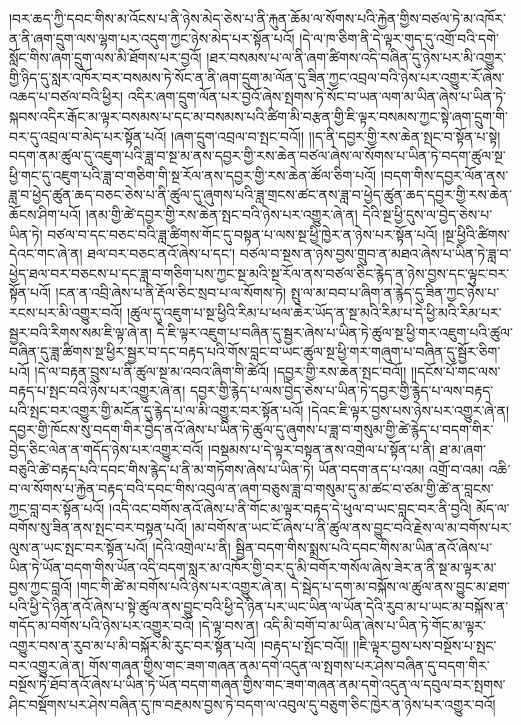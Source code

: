 །བར་ཆད་ཀྱི་དབང་གིས་མ་འོངས་པ་ནི་ཉེས་མེད་ཅེས་པ་ནི་རྐུན་ཆོམ་ལ་སོགས་པའི་རྐྱེན་གྱིས་བཙལ་ཏེ་མ་འཁོར་ན་ནི་ཞག་དྲུག་ལས་ལྷག་པར་འདུག་ཀྱང་ཉེས་མེད་པར་སྟོན་པའོ། །དེ་ལ་ཁ་ཅིག་ནི་དེ་ལྟར་གུད་དུ་འགྲོ་བའི་དགེ་སློང་གིས་ཞག་དྲུག་ལས་མི་ཐོགས་པར་བྱའོ། །ཐར་བསམས་པ་ལ་ནི་ཞག་ཚིགས་འདི་བཞིན་དུ་ཉེས་པར་མི་འགྱུར་གྱི་ཉིད་དུ་སླར་འཁོར་བར་བསམས་ཏེ་སོང་ན་ནི་ཞག་དྲུག་མ་ལོན་དུ་ཟིན་ཀྱང་འབྲལ་བའི་ཉེས་པར་འགྱུར་རོ་ཞེས་འཆད་པ་བཙལ་བའི་ཕྱིར། འདིར་ཞག་དྲུག་ལོན་པར་བྱའོ་ཞེས་སྤགས་ཏེ་སོང་བ་ཡན་ལག་མ་ཡིན་ཞེས་པ་ཡིན་ཏེ་སྐབས་འདིར་རྒོང་མ་ལྟར་བསམས་པ་དང་མ་བསམས་པའི་ཚིག་མི་བརྩན་གྱི་ཇི་ལྟར་བསམས་ཀྱང་སྟེ་ཞག་དྲུག་གི་བར་དུ་འབྲལ་བ་མེད་པར་སྟོན་པའོ། །ཞག་དྲུག་འབྲལ་བ་སྤང་བའོ།། །།ད་ནི་དབྱར་གྱི་རས་ཆེན་སྤང་བ་སྟོན་པ་སྟེ། བདག་ནམ་ཚུལ་དུ་འཇུག་པའི་ཟླ་བ་སྔ་མ་ནས་དབྱར་གྱི་རས་ཆེན་བཙལ་ཞེས་ལ་སོགས་པ་ཡིན་ཏེ་བདག་ཚུལ་སྔ་ཕྱི་གང་དུ་འཇུག་པའི་ཟླ་བ་གཅིག་གི་སྔ་རོལ་ནས་དབྱར་གྱི་རས་ཆེན་ཚོལ་ཅིག་པའོ། །བདག་གིས་དབྱར་ལོན་ནས་ཟླ་བ་ཕྱེད་ཚུན་ཆད་བཅང་ཅེས་པ་ནི་ཚུལ་དུ་ཞུགས་པའི་ཟླ་གྲངས་ཚང་ནས་ཟླ་བ་ཕྱེད་ཚུན་ཆད་དབྱར་གྱི་རས་ཆེན་ཆོངས་ཤིག་པའོ། །ནམ་གྱི་ཚེ་དབྱར་གྱི་རས་ཆེན་སྤང་བའི་ཉེས་པར་འགྱུར་ཞེ་ན། དེའི་སྔ་ཕྱི་དུས་ལ་བྱེད་ཅེས་པ་ཡིན་ཏེ། བཙལ་བ་དང་བཅང་བའི་ཟླ་ཚིགས་གོང་དུ་བསྟན་པ་ལས་སྔ་ཕྱི་ཁྱེར་ན་ཉེས་པར་སྟོན་པའོ། །སྔ་ཕྱིའི་ཚིགས་དེའང་གང་ཞེ་ན། ཐལ་བར་བཅང་ནའོ་ཞེས་པ་དང་། བཙལ་བ་སྔས་ན་ཉེས་བྱས་གྲུབ་ན་མཐའ་ཞེས་པ་ཡིན་ཏེ་ཟླ་བ་ཕྱེད་ཐལ་བར་བཅངས་པ་དང་ཟླ་བ་གཅིག་པས་ཀྱང་སྔ་མའི་སྔ་རོལ་ནས་བཙལ་ཅིང་རྙེད་ན་ཉེས་བྱས་དང་ལྟུང་བར་སྟོན་པའོ། །ངན་ན་འབྲི་ཞེས་པ་ནི་རྡོལ་ཅིང་སྲབ་པ་ལ་སོགས་ཏེ། སྤུ་ལ་མ་བབ་པ་ཞིག་ན་རྙེད་དུ་ཟིན་ཀྱང་ཉེས་པ་རངས་པར་མི་འགྱུར་བའོ། །ཚུལ་དུ་འཇུག་པ་སྔ་ཕྱིའི་རིམ་པ་ཕལ་ཆེར་ཡོད་ན་སྔ་མའི་རིམ་པ་དེ་ཕྱི་མའི་རིམ་པར་སྦྱར་བའི་རིགས་སམ་ཇི་ལྟ་ཞེ་ན། དེ་ཇི་ལྟར་འཇུག་པ་བཞིན་དུ་སྦྱར་ཞེས་པ་ཡིན་ཏེ་ཚུལ་སྔ་ཕྱི་གར་འཇུག་པའི་ཚུལ་བཞིན་དུ་ཟླ་ཚིགས་སྔ་ཕྱིར་སྦྱར་བ་དང་བརྟད་པའི་གོས་བླང་བ་ཡང་ཚུལ་སྔ་ཕྱི་གར་གཞུག་པ་བཞིན་དུ་སྦྱོར་ཅིག་པའོ། །དེ་ལ་བརྟན་བྲུས་པ་ནི་ཚུལ་སྔ་མ་འབའ་ཞིག་གི་ཚེའོ། །དབྱར་གྱི་རས་ཆེན་སྤང་བའོ།། །།དངོས་པོ་གང་ལས་བརྟད་པ་སྤང་བའི་ཉེས་པར་འགྱུར་ཞེ་ན། དབྱར་གྱི་རྙེད་པ་ལས་བྱེད་ཅེས་པ་ཡིན་ཏེ་དབྱར་གྱི་རྙེད་པ་ལས་བརྟད་པའི་སྤང་བར་འགྱུར་གྱི་མངོན་དུ་རྙེད་པ་ལ་མི་འགྱུར་བར་སྟོན་པའོ། །དེའང་ཇི་ལྟར་བྱས་པས་ཉེས་པར་འགྱུར་ཞེ་ན། དབྱར་གྱི་ཁོངས་སུ་བདག་གིར་བྱེད་ནའོ་ཞེས་པ་ཡིན་ཏེ་ཚུལ་དུ་ཞུགས་པ་ཟླ་བ་གསུམ་གྱི་ཚེ་རྙེད་པ་བདག་གིར་བྱེད་ཅིང་ལེན་ན་གདོད་ཉེས་པར་འགྱུར་བའོ། །བསྡམས་པ་དེ་ལྟར་བསྟན་ནས་འགྲེལ་པ་སྟོན་པ་ནི། ཐ་མ་ཞག་བཅུའི་ཚེ་བརྟད་པའི་དབང་གིས་རྙེད་པ་ནི་མ་གཏོགས་ཞེས་པ་ཡིན་ཏེ། ཡོན་བདག་ནད་པ་འམ། འགྲོ་བ་འམ། འཆི་བ་ལ་སོགས་པ་རྐྱེན་བརྟད་བའི་དབང་གིས་འབུལ་ན་ཞག་བཅུས་ཟླ་བ་གསུམ་དུ་མ་ཚང་བ་ཙམ་གྱི་ཚེ་ན་བླངས་ཀྱང་བླ་བར་སྟོན་པའོ། །འདི་འང་བགོས་ནའོ་ཞེས་པ་ནི་གོང་མ་ལྟར་བརྟད་དེ་ཕུལ་བ་ཡང་བླང་བར་ནི་བྱའི། མོད་ལ་བགོས་སུ་ཟིན་ནས་སྤང་བར་བསྟན་པའོ། །མ་བགོས་ན་ཡང་ངོ་ཞེས་པ་ནི་ཚུལ་ནས་བྱུང་བའི་རྗེས་ལ་མ་བགོས་པར་ལུས་ན་ཡང་སྤང་བར་སྟོན་པའོ། །དེའི་འགྲེལ་པ་ནི། སྦྱིན་བདག་གིས་སྨྲས་པའི་དབང་གིས་མ་ཡིན་ནའོ་ཞེས་པ་ཡིན་ཏེ་ཡོན་བདག་གིས་ཡོན་འདི་བདག་སླར་མ་འཁོར་གྱི་བར་དུ་མི་བགོར་གསོལ་ཞེས་ཟེར་ན་ནི་སྔ་མ་ལྟར་མ་བྱས་ཀྱང་བླའོ། །གང་གི་ཚེ་མ་བགོས་པའི་ཉེས་པར་འགྱུར་ཞེ་ན། དེ་སྦེད་པ་དག་མ་བསྐོས་ལ་ཚུལ་ནས་བྱུང་མ་ཐག་པའི་ཕྱི་དེ་ཉིན་ནའོ་ཞེས་པ་སྟེ་ཚུལ་ནས་བྱུང་བའི་ཕྱི་དེ་ཉིན་པར་ཡང་ཡིན་ལ་ཡོན་དེའི་རུབ་མ་པ་ཡང་མ་བསྐོས་ན་གདོད་མ་བགོས་པའི་ཉེས་པར་འགྱུར་བའོ། །དེ་ལྟ་བས་ན། འདི་མི་བགོ་བ་མ་ཡིན་ཞེས་པ་ཡིན་ཏེ་གོང་མ་ལྟར་འགྱུར་བས་ན་རུབ་མ་པ་མི་བསྐོར་མི་རུང་བར་སྟོན་པའོ། །བརྟད་པ་སྤོང་བའོ།། །།ཇི་ལྟར་བྱས་པས་བསྔོས་པ་སྤང་བར་འགྱུར་ཞེ་ན། གོས་གཞན་གྱིས་གང་ཟག་གཞན་ནམ་དགེ་འདུན་ལ་སྤགས་པར་ཤེས་བཞིན་དུ་བདག་གིར་བསྔོས་ཏེ་ཐོབ་ནའོ་ཞེས་པ་ཡིན་ཏེ་ཡོན་བདག་གཞན་གྱིས་གང་ཟག་གཞན་ནམ་དགེ་འདུན་ལ་དབུལ་བར་སྤགས་ཤིང་བསྡོགས་པར་ཤེས་བཞིན་དུ་ཁ་བརྔམས་བྱས་ཏེ་བདག་ལ་འབུལ་དུ་བཅུག་ཅིང་ཁྱེར་ན་ཉེས་པར་འགྱུར་བའོ། 